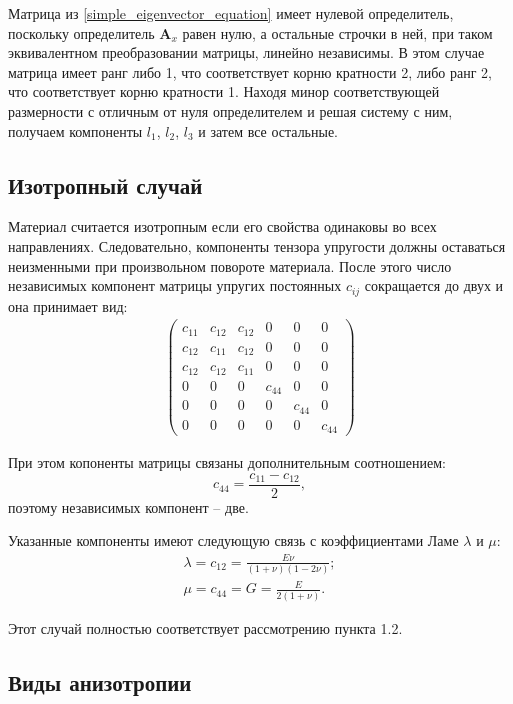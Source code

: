 	Матрица из \eqref{simple_eigenvector_equation} имеет нулевой определитель, поскольку определитель $\mathbf{A}_x$  равен нулю, а остальные строчки в ней, при таком эквивалентном преобразовании матрицы, линейно независимы.
	В этом случае матрица имеет ранг либо 1, что соответствует корню кратности 2, либо ранг 2, что соответствует корню кратности 1.
	Находя минор соответствующей размерности с отличным от нуля определителем и решая систему с ним, получаем компоненты $l_1$, $l_2$, $l_3$ и затем все остальные.

\subsection{Изотропный случай}
	
	Материал считается изотропным если его свойства одинаковы во всех направлениях.
	Следовательно, компоненты тензора упругости должны оставаться неизменными при произвольном повороте материала.
	После этого число независимых компонент матрицы упругих постоянных $c_{ij}$ сокращается до двух и она принимает вид:
\begin{align}
\left( \begin{array}{cccccccccccc}
c_{11} & c_{12} & c_{12} & 0 & 0 & 0 \\ 
c_{12} & c_{11} & c_{12} & 0 & 0 & 0 \\ 
c_{12} & c_{12} & c_{11} & 0 & 0 & 0 \\ 
0 & 0 & 0 & c_{44} & 0 & 0 \\ 
0 & 0 & 0 & 0 & c_{44} & 0 \\ 
0 & 0 & 0 & 0 & 0 & c_{44}
\end{array} \right){}
\end{align}

	При этом копоненты матрицы связаны дополнительным соотношением:
\begin{equation}
	c_{44} = \frac{c_{11} - c_{12}}{2},
\end{equation}
	поэтому независимых компонент -- две.
	
	Указанные компоненты имеют следующую связь с коэффициентами Ламе $\lambda$ и $\mu$:
\begin{align}
	\lambda = c_{12} = \frac{E\nu}{(1 + \nu)(1 - 2\nu)};\\
	\mu = c_{44} = G = \frac{E}{2(1 + \nu)}.
\end{align}

	Этот случай полностью соответствует рассмотрению пункта 1.2.

\subsection{Виды анизотропии}
